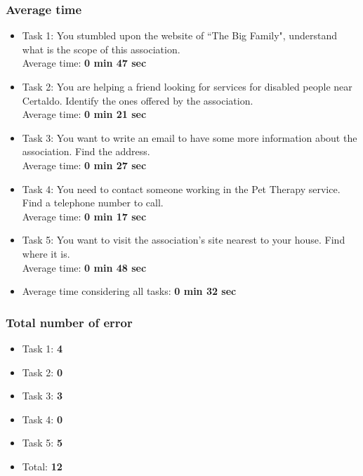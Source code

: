 \subsubsection{Average time}
\begin{itemize}

\item Task 1: You stumbled upon the website of “The Big Family", understand what is the scope of this association.\\
Average time: \textbf{0 min 47 sec}

\item Task 2: You are helping a friend looking for services for disabled people near Certaldo. Identify the ones offered by the association.\\
Average time: \textbf{0 min 21 sec}

\item Task 3: You want to write an email to have some more information about the association. Find the address.\\
Average time: \textbf{0 min 27 sec}

\item Task 4: You need to contact someone working in the Pet Therapy service. Find a telephone number to call.\\
Average time: \textbf{0 min 17 sec}

\item Task 5: You want to visit the association’s site nearest to your house. Find where it is.\\
Average time: \textbf{0 min 48 sec}

\item Average time considering all tasks: \textbf{0 min 32 sec}
\end{itemize}

\subsubsection{Total number of error}
\begin{itemize}
\item Task 1: \textbf{4}
\item Task 2: \textbf{0}
\item Task 3: \textbf{3}
\item Task 4: \textbf{0}
\item Task 5: \textbf{5}
\item Total: \textbf{12}
\end{itemize}

